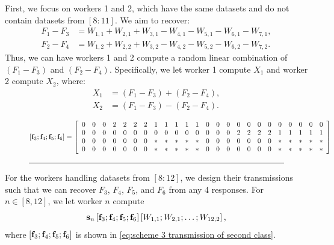 \documentclass[conference,letterpaper]{IEEEtran}
\begin{document}
\begin{example}
First, we focus on workers 1 and 2, which have the same datasets and do not contain datasets from $[8:11]$. We aim to recover:
\begin{align*}
    F_1 - F_3 &= W_{1,1} + W_{2,1} + W_{3,1} - W_{4,1} - W_{5,1} - W_{6,1} - W_{7,1}, \\
    F_2 - F_4 &= W_{1,2} + W_{2,2} + W_{3,2} - W_{4,2} - W_{5,2} - W_{6,2} - W_{7,2}.
\end{align*}
Thus, we can have workers 1 and 2 compute a random linear combination of $(F_1 - F_3)$ and $(F_2 - F_4)$. Specifically, we let worker 1 compute $X_1$ and worker 2 compute $X_2$, where:
\begin{align*}
    X_1 &= (F_1 - F_3) + (F_2 - F_4), \\
    X_2 &= (F_1 - F_3) - (F_2 - F_4).
\end{align*}

\begin{figure}
\begin{equation} \label{eq:scheme 3 transmission of second class}
\begin{aligned}
\left[ {{\bf f}}_3 ;  {{\bf f}}_4 ;  {{\bf f}}_5 ;  {{\bf f}}_6 \right] = 
 \left[
\begin{array}{cccccccccccccccccccccccc}
 0 & 0 & 0 &  2 & 2 & 2 & 2 &  1 & 1 & 1 & 1 & 1 & 0 & 0 & 0 & 0 & 0 & 0 & 0 & 0 & 0 & 0 & 0 & 0 \\
 0 & 0 & 0 & 0 & 0 & 0 & 0 & 0 & 0 & 0 & 0 & 0 & 0 & 0 & 0 & 2 & 2 & 2 & 2 & 1 & 1 & 1 & 1 & 1 \\
 0 & 0 & 0 & 0 & 0 & 0 & 0 & * & * & * & * & * & 0 & 0 & 0 & 0 & 0 & 0 & 0 & * & * & * & * & * \\
 0 & 0 & 0 & 0 & 0 & 0 & 0 & * & * & * & * & * & 0 & 0 & 0 & 0 & 0 & 0 & 0 & * & * & * & * & *
\end{array}
 \right]
\end{aligned}
\end{equation}
\rule{\textwidth}{0.2pt} %
\end{figure}

For the workers handling datasets from $[8:12]$, we design their transmissions such that we can recover $F_3$, $F_4$, $F_5$, and $F_6$ from any 4 responses.
For \( n \in [8, 12] \), we let worker \( n \) compute 
\[
{\bf s}_{n} \left[ {{\bf f}}_3 ; {{\bf f}}_4 ; {{\bf f}}_5 ; {{\bf f}}_6 \right] \left[ W_{1,1}; W_{2,1}; \ldots; W_{12,2} \right],
\]
where \( \left[ {{\bf f}}_3 ; {{\bf f}}_4 ; {{\bf f}}_5 ; {{\bf f}}_6 \right] \) is shown in \eqref{eq:scheme 3 transmission of second class}.


\end{example}
\end{document}
